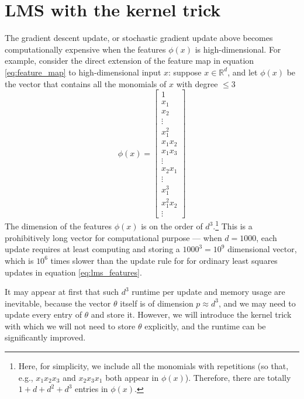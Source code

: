 \section{LMS with the kernel trick}
The gradient descent update, or stochastic gradient update above becomes
computationally expensive when the features $\phi(x)$ is high-dimensional. For
example, consider the direct extension of the feature map in equation \ref{eq:feature_map} to
high-dimensional input $x$: suppose $x \in \mathbb{R}^d$, and let $\phi(x)$ be the vector that
contains all the monomials of $x$ with degree $\le 3$
\begin{equation}
    \phi(x) = \begin{bmatrix}
        1\\
        x_1\\
        x_2\\
        \vdots\\
        x_1^2\\
        x_1x_2\\
        x_1x_3\\
        \vdots\\
        x_2x_1\\
        \vdots\\
        x_1^3\\
        x_1^2x_2\\
        \vdots
    \end{bmatrix}\label{eq:high_dim_feature_map}
\end{equation}
The dimension of the features $\phi(x)$ is on the order of $d^3$.\footnote{
Here, for simplicity, we include all the monomials with repetitions (so that, e.g., $x_1 x_2 x_3$
and $x_2 x_3 x_1$ both appear in $\phi(x)$). Therefore, there are totally $1 + d + d^2 + d^3$ entries in
$\phi(x)$.}
This is a prohibitively long vector for computational purpose --- when $d = 1000$, each
update requires at least computing and storing a $1000^3 = 10^9$ dimensional
vector, which is $10^6$ times slower than the update rule for for ordinary least
squares updates in equation \ref{eq:lms_features}. %

It may appear at first that such $d^3$ runtime per update and memory usage
are inevitable, because the vector $\theta$ itself is of dimension $p \approx d^3$, and we may
need to update every entry of $\theta$ and store it. However, we will introduce the
kernel trick with which we will not need to store $\theta$ explicitly, and the runtime
can be significantly improved.

